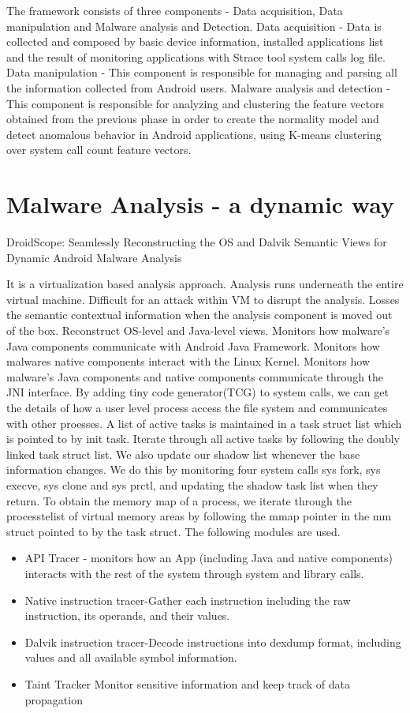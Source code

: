 \documentclass[12pt]{report}
\begin{document}
    The framework consists of three components - Data acquisition, Data manipulation and Malware analysis and Detection. Data acquisition - Data is collected and composed by basic
    device information, installed applications list and the
    result of monitoring applications with Strace tool system
    calls log file. Data manipulation - This component is responsible
    for managing and parsing all the information collected
    from Android users. Malware analysis and detection - This component
    is responsible for analyzing and clustering the feature
    vectors obtained from the previous phase in order to
    create the normality model and detect anomalous behavior
    in Android applications, using K-means clustering
    over system call count feature vectors.

\section{Malware Analysis - a dynamic way}
DroidScope: Seamlessly Reconstructing the OS and Dalvik Semantic Views for Dynamic Android Malware Analysis\citep{kwong2012droidscope}

   It is a virtualization based analysis approach. Analysis runs underneath the entire virtual machine. Difficult for an attack within VM to disrupt the analysis. Losses the semantic contextual information when the analysis component is moved out of the box. Reconstruct OS-level and Java-level views. Monitors how malware’s Java components communicate with Android Java Framework. Monitors how malware\textquotesingle  s native components interact with the Linux Kernel. Monitors how malware’s Java components and native components communicate through the JNI interface. By adding tiny code generator(TCG) to system calls, we can get the details of how a user level process  access the file system and communicates with other proesses. A list of active tasks is maintained in a task struct list which is pointed to by init task. Iterate through all active tasks by following the doubly linked task struct list. We also update our  shadow list whenever the base information changes. We do this by monitoring four system calls sys fork, sys execve, sys clone and sys prctl, and updating the shadow task list when they  return. To obtain the memory map of a process, we iterate through the processte\textquotesingle list of virtual memory areas by following the mmap pointer in the mm struct pointed to by the task struct. The following modules are used.
	\begin{itemize}
		\item API Tracer -  monitors how an App (including Java and
native components) interacts with the rest of the system
through system and library calls. 
		\item Native instruction tracer-Gather each instruction including the raw instruction, its operands, and their values.
		\item Dalvik instruction tracer-Decode instructions into dexdump format, including values and all available symbol information.
		\item Taint Tracker Monitor sensitive information and keep track of data propagation
	\end{itemize}   
\end{document}
